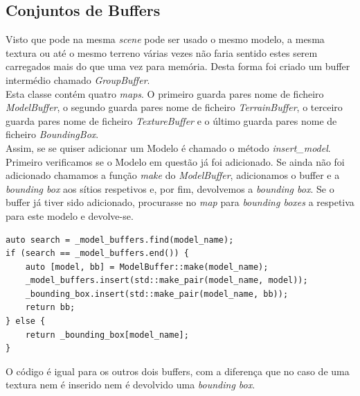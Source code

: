 \documentclass[a4paper]{report}
\begin{document}
\subsection{Conjuntos de Buffers}
Visto que pode na mesma \textit{scene} pode ser usado o mesmo modelo, a mesma
textura ou até o mesmo terreno várias vezes não faria sentido estes serem
carregados mais do que uma vez para memória. Desta forma foi criado um buffer
intermédio chamado \textit{GroupBuffer}.\\
Esta classe contém quatro \textit{maps}. O primeiro guarda pares nome de
ficheiro \textit{ModelBuffer}, o segundo guarda pares nome de ficheiro
\textit{TerrainBuffer}, o terceiro guarda pares nome de ficheiro
\textit{TextureBuffer} e o último guarda pares nome de ficheiro
\textit{BoundingBox}.\\
Assim, se se quiser adicionar um Modelo é chamado o método
\textit{insert\_model}. Primeiro verificamos se o Modelo em questão já foi
adicionado. Se ainda não foi adicionado chamamos a função \textit{make} do
\textit{ModelBuffer}, adicionamos o buffer e a \textit{bounding box} aos sítios
respetivos e, por fim, devolvemos a \textit{bounding box}. Se o buffer já tiver
sido adicionado, procurasse no \textit{map} para \textit{bounding boxes} a
respetiva para este modelo e devolve-se.
\begin{lstlisting}
auto search = _model_buffers.find(model_name);
if (search == _model_buffers.end()) {
    auto [model, bb] = ModelBuffer::make(model_name);
    _model_buffers.insert(std::make_pair(model_name, model));
    _bounding_box.insert(std::make_pair(model_name, bb));
    return bb;
} else {
    return _bounding_box[model_name];
}
\end{lstlisting}
O código é igual para os outros dois buffers, com a diferença que no caso de uma
textura nem é inserido nem é devolvido uma \textit{bounding box}.
\end{document}
